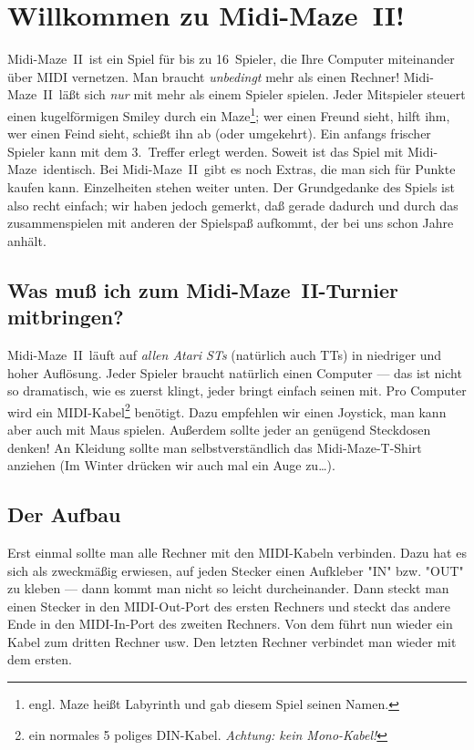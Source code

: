 \documentclass[12pt,twoside]{article}
\newcommand{\mmI}{{\sc Midi-Maze}}
\newcommand{\mm}{\mmI~{\sc II}}
\begin{document}
\section{Willkommen zu \mm!}


\mm\ ist ein Spiel f\"ur bis zu 16~Spieler, die Ihre Computer miteinander \"uber 
MIDI vernetzen. Man braucht {\em unbedingt\/} mehr als einen Rechner! \mm\ 
l\"a\ss{}t sich {\em nur\/} mit mehr als einem Spieler spielen. Jeder Mitspieler 
steuert einen kugelf\"ormigen Smiley durch ein Maze\footnote{engl. Maze hei\ss{}t 
Labyrinth und gab diesem Spiel seinen Namen.}; wer einen Freund sieht, hilft 
ihm, wer einen Feind sieht, schie\ss{}t ihn ab (oder umgekehrt). Ein anfangs 
frischer Spieler kann mit dem 3.~Treffer erlegt werden. Soweit ist das Spiel 
mit \mmI\ identisch. Bei \mm\ gibt es noch Extras, die man sich f\"ur Punkte 
kaufen kann. Einzelheiten stehen weiter unten. Der Grundgedanke des Spiels 
ist also recht einfach; wir haben jedoch gemerkt, da\ss{} gerade dadurch und 
durch das zusammenspielen mit anderen der Spielspa\ss{} aufkommt, der bei uns 
schon Jahre anh\"alt.


\subsection{Was mu\ss{} ich zum \mm-Turnier mitbringen?}


\mm\ l\"auft auf {\em allen Atari STs\/} (nat\"urlich auch TTs) in niedriger und 
hoher Auf\/l\"osung. Jeder Spieler braucht nat\"urlich einen Computer --- das 
ist nicht so dramatisch, wie es zuerst klingt, jeder bringt einfach seinen 
mit. Pro Computer wird ein MIDI-Kabel\footnote{ein normales 5 poliges 
DIN-Kabel. {\em Achtung: kein Mono-Kabel!}} ben\"otigt. Dazu empfehlen wir 
einen Joystick, man kann aber auch mit Maus spielen. Au\ss{}erdem sollte jeder an 
gen\"ugend Steckdosen denken! An Kleidung sollte man selbstverst\"andlich das 
\mmI-T-Shirt anziehen (Im Winter dr\"ucken wir auch mal ein Auge zu\dots).


\subsection{Der Aufbau}


Erst einmal sollte man alle Rechner mit den MIDI-Kabeln verbinden. Dazu hat 
es sich als zweckm\"a\ss{}ig erwiesen, auf jeden Stecker einen Aufkleber "IN" 
bzw. "OUT" zu kleben --- dann kommt man nicht so leicht durcheinander. 
Dann steckt man einen Stecker in den MIDI-Out-Port des ersten Rechners und 
steckt das andere Ende in den MIDI-In-Port des zweiten Rechners. Von dem 
f\"uhrt nun wieder ein Kabel zum dritten Rechner usw. Den letzten Rechner 
verbindet man wieder mit dem ersten.
\end{document}
